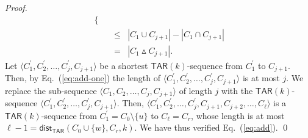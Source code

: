 \documentclass{llncs}
\newcommand{\TAR}[1]{\mathsf{TAR}(#1)}
\newcommand{\symdiff}[2]{#1 \vartriangle #2}
\newcommand{\ini}{0}
\newcommand{\tar}{r}
\newcommand{\cliq}{C}
\newcommand{\distTAR}[3]{\mathsf{dist_{TAR}}(#1,#2,#3)}
\newcounter{one}
\begin{document}
\begin{proof}
\begin{eqnarray*}
\begin{cases}
						\end{cases} \\
				&\le& |\cliq_{1} \cup \cliq_{j+1}| - |\cliq_{1} \cap \cliq_{j+1}| \\
				&=& |\symdiff{\cliq_{1}}{\cliq_{j+1}}|.
	\end{eqnarray*}
	Let $\langle \cliq_1^\prime, \cliq_2^\prime, \ldots, \cliq_{j}^\prime, \cliq_{j+1} \rangle$ be a shortest $\TAR{k}$-sequence from $\cliq_{1}^\prime$ to $\cliq_{j+1}$.
	Then, by Eq.~(\ref{eq:add-one}) the length of $\langle \cliq_1^\prime, \cliq_2^\prime, \ldots, \cliq_{j}^\prime, \cliq_{j+1} \rangle$ is at most $j$.
	We replace the sub-sequence $\langle \cliq_1, \cliq_2, \ldots, \cliq_{j}, \cliq_{j+1} \rangle$ of length $j$ with the $\TAR{k}$-sequence $\langle \cliq_1^\prime, \cliq_2^\prime, \ldots, \cliq_{j}^\prime, \cliq_{j+1} \rangle$.
	Then, $\langle \cliq_1^\prime, \cliq_2^\prime, \ldots, \cliq_{j}^\prime, \cliq_{j+1}, \cliq_{j+2}, \ldots, \cliq_{\ell} \rangle$ is a $\TAR{k}$-sequence from $\cliq_{1}^\prime = \cliq_\ini \setminus \{u\}$ to $\cliq_{\ell} = \cliq_{\tar}$, whose length is at most $\ell-1 = \distTAR{\cliq_{\ini} \cup \{w\}}{\cliq_{\tar}}{k}$.
	We have thus verified Eq.~(\ref{eq:add}). 
\qed
\end{proof}
\end{document}

